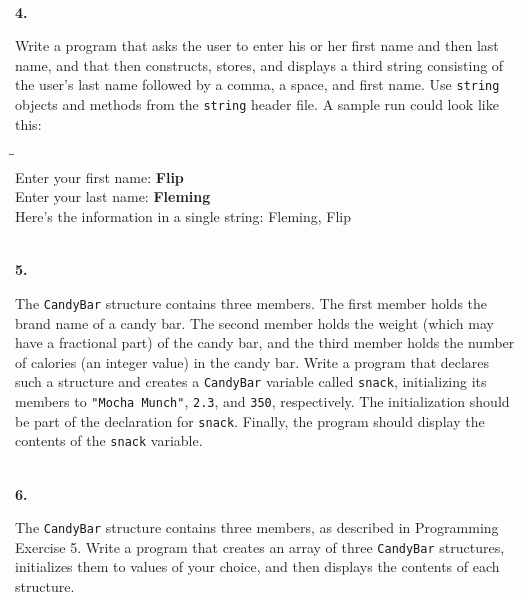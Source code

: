 \documentclass[10 pt]{amsart}
\newlength{\cwidth}
\newenvironment{cpart}[2][\cwidth]
	{\\ \phantom{\qquad}\textbf{#2. }\begin{minipage}[t]{#1}}
	{\end{minipage}}
\begin{document}
	\begin{cpart}{4}
		Write a program that asks the user to enter his or her first 
		name and then last name, and that then constructs, stores, 
		and displays a third string consisting of the user's last name
		followed by a comma, a space, and first name.
		Use \texttt{string} objects and methods from the \texttt{string}
		header file.
		A sample run could look like this:
		{\ttfamily
			\begin{tabbing}
				\phantom{\qquad}\=\phantom{\qquad}\=\phantom{\qquad}\= \\
				Enter your first name: {\bf Flip} \\
				Enter your last name: {\bf Fleming} \\
				Here's the information in a single string:
					Fleming, Flip
			\end{tabbing}
		}		
	\end{cpart}
	\vspace{2ex}

	\begin{cpart}{5}
		The \texttt{CandyBar} structure contains three members.
		The first member holds the brand name of a candy bar.
		The second member holds the weight (which may have a fractional
		part) of the candy bar, and the third member holds the number
		of calories (an integer value) in the candy bar.
		Write a program that declares such a structure and creates a
		\texttt{CandyBar} variable called \texttt{snack}, initializing
		its members to \texttt{"Mocha Munch"}, \texttt{2.3}, and 
		\texttt{350}, respectively. 
		The initialization should be part of the declaration for 
		\texttt{snack}.
		Finally, the program should display the contents of the 
		\texttt{snack} variable.
	\end{cpart}
	\vspace{2ex}

	\begin{cpart}{6}
		The \texttt{CandyBar} structure contains three members, as 
		described in Programming Exercise 5.
		Write a program that creates an array of three \texttt{CandyBar}
		structures, initializes them to values of your choice, and
		then displays the contents of each structure.
	\end{cpart}
	\vspace{2ex}
\end{document}
